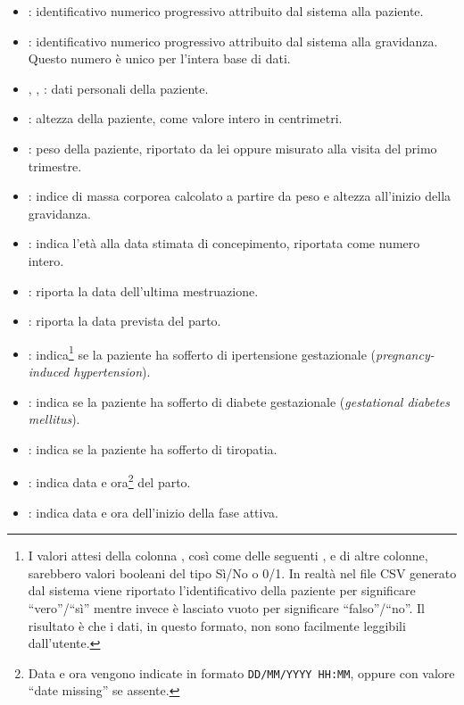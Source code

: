 \begin{itemize}
\item {}: identificativo numerico progressivo attribuito dal sistema alla paziente.
\item {}: identificativo numerico progressivo attribuito dal sistema alla gravidanza. Questo numero è unico per l'intera base di dati.
\item {}, , : dati personali della paziente.
\item {}: altezza della paziente, come valore intero in centrimetri.
\item {}: peso della paziente, riportato da lei oppure misurato alla visita del primo trimestre.
\item {}: indice di massa corporea calcolato a partire da peso e altezza all'inizio della gravidanza.
\item {}: indica l'età alla data stimata di concepimento, riportata come numero intero.
\item {}: riporta la data dell'ultima mestruazione.
\item {}: riporta la data prevista del parto.
\item {}: indica\footnote{
    I valori attesi della colonna , così come delle seguenti ,  e di altre colonne, sarebbero valori booleani del tipo Sì/No o 0/1. In realtà nel file CSV generato dal sistema viene riportato l'identificativo della paziente per significare \enquote{vero}/\enquote{sì} mentre invece è lasciato vuoto per significare \enquote{falso}/\enquote{no}. Il risultato è che i dati, in questo formato, non sono facilmente leggibili dall'utente.
} se la paziente ha sofferto di ipertensione gestazionale (\emph{pregnancy-induced hypertension}).
\item {}: indica se la paziente ha sofferto di diabete gestazionale (\emph{gestational diabetes mellitus}).
\item {}: indica se la paziente ha sofferto di tiropatia.
\item {}: indica data e ora\footnote{
    Data e ora vengono indicate in formato \texttt{DD/MM/YYYY HH:MM}, oppure con valore \enquote{date missing} se assente.
} del parto.
\item {}: indica data e ora dell'inizio della fase attiva.

\end{itemize}
